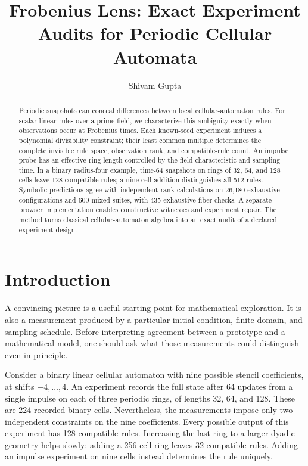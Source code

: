 \documentclass{ijuc}
\title{Frobenius Lens: Exact Experiment Audits for Periodic Cellular Automata}
\author{Shivam Gupta}
\institute{Independent Researcher, Delhi 110033, India\\
\href{mailto:shivam1720406@gmail.com}{shivam1720406@gmail.com}\\
ORCID: \href{https://orcid.org/0009-0009-4576-0138}{0009-0009-4576-0138}}
\begin{document}
\maketitle
\begin{abstract}
Periodic snapshots can conceal differences between local cellular-automaton rules. For scalar linear rules over a prime field, we characterize this ambiguity exactly when observations occur at Frobenius times. Each known-seed experiment induces a polynomial divisibility constraint; their least common multiple determines the complete invisible rule space, observation rank, and compatible-rule count. An impulse probe has an effective ring length controlled by the field characteristic and sampling time. In a binary radius-four example, time-64 snapshots on rings of 32, 64, and 128 cells leave 128 compatible rules; a nine-cell addition distinguishes all 512 rules. Symbolic predictions agree with independent rank calculations on 26,180 exhaustive configurations and 600 mixed suites, with 435 exhaustive fiber checks. A separate browser implementation enables constructive witnesses and experiment repair. The method turns classical cellular-automaton algebra into an exact audit of a declared experiment design.
\end{abstract}

\section{Introduction}
A convincing picture is a useful starting point for mathematical exploration. It is also a measurement produced by a particular initial condition, finite domain, and sampling schedule. Before interpreting agreement between a prototype and a mathematical model, one should ask what those measurements could distinguish even in principle.

Consider a binary linear cellular automaton with nine possible stencil coefficients, at shifts $-4,\ldots,4$. An experiment records the full state after 64 updates from a single impulse on each of three periodic rings, of lengths 32, 64, and 128. These are 224 recorded binary cells. Nevertheless, the measurements impose only two independent constraints on the nine coefficients. Every possible output of this experiment has 128 compatible rules. Increasing the last ring to a larger dyadic geometry helps slowly: adding a 256-cell ring leaves 32 compatible rules. Adding an impulse experiment on nine cells instead determines the rule uniquely.
\end{document}
